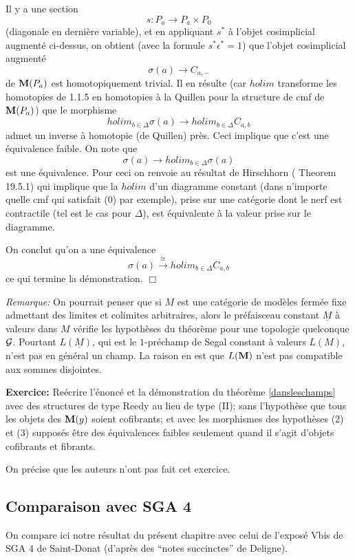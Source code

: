 \documentclass[12pt]{article}
\newcommand{\subnumero}[1]{\subsection*{#1}\phantomsection\addcontentsline{toc}{subsection}{#1}}
\newcommand{\eop}{\hfill $\Box$\vspace{.1in}}
\newcommand{\mm}{{\bf M}}
\newcommand{\Gg}{{\cal G}}
\begin{document}
Il y a une section
$$
s:P_a\rightarrow P_a\times P_0
$$
(diagonale en derni\`ere variable), et en appliquant $s^{\ast}$ \`a l'objet
cosimplicial augment\'e ci-dessus, on obtient (avec la formule
$s^{\ast} \epsilon ^{\ast} = 1$) que
l'objet cosimplicial augment\'e
$$
\sigma (a) \rightarrow C_{a,-}
$$
de $\mm (P_a)$ est homotopiquement trivial.
Il en r\'esulte (car $holim$ transforme les homotopies de \cite{Illusie} 1.1.5
en  homotopies \`a la Quillen \cite{Quillen} pour la structure de cmf de $\mm
(P_a)$) que le morphisme
$$
holim _{b\in \Delta}\sigma (a)\rightarrow  holim _{b\in \Delta}
C_{a,b}
$$
admet un inverse \`a homotopie (de Quillen) pr\`es. Ceci implique
que c'est une \'equivalence faible. On note que
$$
\sigma (a)\rightarrow holim _{b\in \Delta}\sigma (a)
$$
est une \'equivalence. Pour ceci on renvoie au r\'esultat de Hirschhorn
(\cite{Hirschhorn}
Theorem 19.5.1) qui implique que la $holim$ d'un diagramme constant (dans
n'importe quelle cmf qui satisfait (0) par exemple), prise sur une cat\'egorie
dont le nerf est contractile (tel est le cas pour $\Delta$), est \'equivalente
\`a la valeur prise sur le diagramme.

On conclut qu'on a une \'equivalence
$$
\sigma (a)\stackrel{\cong}{\rightarrow} holim _{b\in \Delta}
C_{a,b}
$$
ce qui termine la d\'emonstration.
\eop

{\em Remarque:}
On pourrait penser que si $M$ est une cat\'egorie de mod\`eles ferm\'ee fixe
admettant des limites et colimites arbitraires, alors le pr\'efaisceau constant
$\underline{M}$ \`a valeurs dans $M$ v\'erifie les hypoth\`eses du
th\'eor\`eme pour une topologie quelconque $\Gg$. Pourtant $L(\underline{M})$,
qui est
le $1$-pr\'echamp de Segal constant \`a valeurs $L(M)$, n'est pas en g\'en\'eral
un champ. La raison en est que $L(\mm )$ n'est pas compatible aux sommes
disjointes.

{\bf Exercice:} Re\'ecrire l'\'enonc\'e et la d\'emonstration du th\'eor\`eme
\ref{dansleschamps} avec des structures de type Reedy au lieu de type (II);
sans l'hypoth\`ese que tous les objets des $\mm (y)$ soient cofibrants; et avec
les morphismes
des hypoth\`eses (2) et (3) suppos\'es \^etre
des \'equivalences faibles seulement
quand il s'agit d'objets cofibrants et fibrants.

On pr\'ecise que les auteurs n'ont pas fait cet exercice.

\subnumero{Comparaison avec SGA 4}
On compare ici notre r\'esultat du pr\'esent chapitre avec celui de
l'expos\'e Vbis de SGA 4 \cite{SGA4b} de Saint-Donat (d'apr\`es des
``notes
succinctes'' de Deligne).
\end{document}

